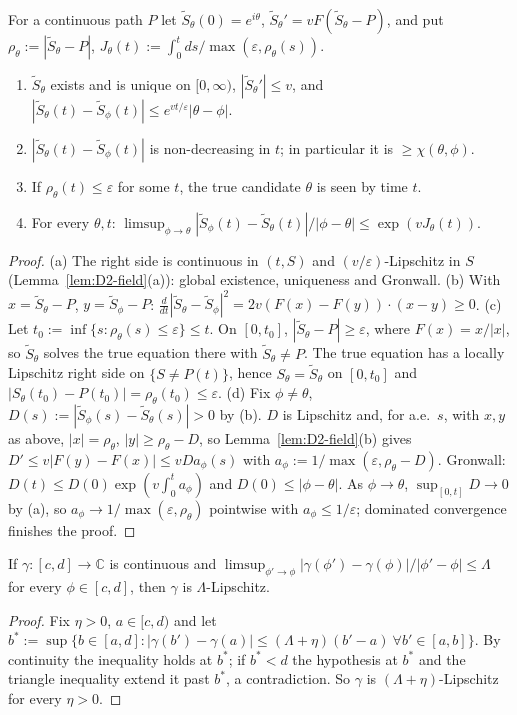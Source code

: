 \begin{lemma}\label{lem:D2-virtual}
For a continuous path $P$ let $\tilde S_\theta(0)=e^{i\theta}$, $\tilde S_\theta'=vF(\tilde S_\theta-P)$, and put
$\rho_\theta:=|\tilde S_\theta-P|$, $J_\theta(t):=\int_0^t ds/\max(\varepsilon,\rho_\theta(s))$.
\begin{enumerate}
\item[(a)] $\tilde S_\theta$ exists and is unique on $[0,\infty)$, $|\tilde S_\theta'|\le v$, and
$|\tilde S_\theta(t)-\tilde S_\phi(t)|\le e^{vt/\varepsilon}|\theta-\phi|$.
\item[(b)] $|\tilde S_\theta(t)-\tilde S_\phi(t)|$ is non-decreasing in $t$; in particular it is $\ge\chi(\theta,\phi)$.
\item[(c)] If $\rho_\theta(t)\le\varepsilon$ for some $t$, the true candidate $\theta$ is seen by time $t$.
\item[(d)] For every $\theta,t$: $\limsup_{\phi\to\theta}|\tilde S_\phi(t)-\tilde S_\theta(t)|/|\phi-\theta|\le\exp(vJ_\theta(t))$.
\end{enumerate}
\end{lemma}
\begin{proof}
(a) The right side is continuous in $(t,S)$ and $(v/\varepsilon)$-Lipschitz in $S$ (Lemma~\ref{lem:D2-field}(a)): global
existence, uniqueness and Gronwall. (b) With $x=\tilde S_\theta-P$, $y=\tilde S_\phi-P$:
$\frac{d}{dt}|\tilde S_\theta-\tilde S_\phi|^2=2v(F(x)-F(y))\cdot(x-y)\ge0$.
(c) Let $t_0:=\inf\{s:\rho_\theta(s)\le\varepsilon\}\le t$. On $[0,t_0]$, $|\tilde S_\theta-P|\ge\varepsilon$, where $F(x)=x/|x|$, so
$\tilde S_\theta$ solves the true equation there with $\tilde S_\theta\ne P$. The true equation has a locally Lipschitz right side on
$\{S\ne P(t)\}$, hence $S_\theta=\tilde S_\theta$ on $[0,t_0]$ and $|S_\theta(t_0)-P(t_0)|=\rho_\theta(t_0)\le\varepsilon$.
(d) Fix $\phi\ne\theta$, $D(s):=|\tilde S_\phi(s)-\tilde S_\theta(s)|>0$ by (b). $D$ is Lipschitz and, for a.e.\ $s$, with $x,y$ as
above, $|x|=\rho_\theta$, $|y|\ge\rho_\theta-D$, so Lemma~\ref{lem:D2-field}(b) gives $D'\le v|F(y)-F(x)|\le vDa_\phi(s)$ with
$a_\phi:=1/\max(\varepsilon,\rho_\theta-D)$. Gronwall: $D(t)\le D(0)\exp(v\int_0^ta_\phi)$ and $D(0)\le|\phi-\theta|$. As
$\phi\to\theta$, $\sup_{[0,t]}D\to0$ by (a), so $a_\phi\to1/\max(\varepsilon,\rho_\theta)$ pointwise with $a_\phi\le1/\varepsilon$;
dominated convergence finishes the proof.
\end{proof}

\begin{lemma}[D2.3]\label{lem:D2-lip}
If $\gamma:[c,d]\to\mathbb C$ is continuous and $\limsup_{\phi'\to\phi}|\gamma(\phi')-\gamma(\phi)|/|\phi'-\phi|\le\Lambda$ for every
$\phi\in[c,d]$, then $\gamma$ is $\Lambda$-Lipschitz.
\end{lemma}
\begin{proof}
Fix $\eta>0$, $a\in[c,d)$ and let $b^*:=\sup\{b\in[a,d]:|\gamma(b')-\gamma(a)|\le(\Lambda+\eta)(b'-a)\ \forall b'\in[a,b]\}$.
By continuity the inequality holds at $b^*$; if $b^*<d$ the hypothesis at $b^*$ and the triangle inequality extend it past $b^*$, a
contradiction. So $\gamma$ is $(\Lambda+\eta)$-Lipschitz for every $\eta>0$.
\end{proof}

